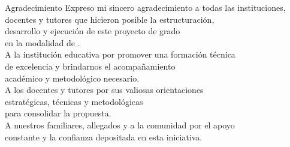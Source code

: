 \begin{estilodedicatoria}{Agradecimiento}
    Expreso mi sincero agradecimiento a todas las instituciones,\\
    docentes y tutores que hicieron posible la estructuración,\\
    desarrollo y ejecución de este proyecto de grado\\
    en la modalidad de \modalidad.\\[0.5cm]
    A la institución educativa por promover una formación técnica\\
    de excelencia y brindarnos el acompañamiento\\
    académico y metodológico necesario.\\[0.5cm]
    A los docentes y tutores por sus valiosas orientaciones\\
    estratégicas, técnicas y metodológicas\\
    para consolidar la propuesta.\\[0.5cm]
    A nuestros familiares, allegados y a la comunidad por el apoyo\\
    constante y la confianza depositada en esta iniciativa.
\end{estilodedicatoria}
